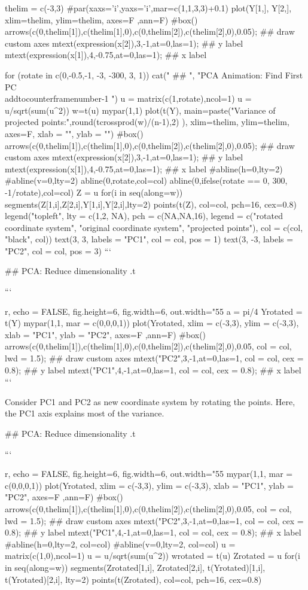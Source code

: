{{thelim = c(-3,3)
#par(xaxs='i',yaxs='i',mar=c(1,1,3,3)+0.1)
plot(Y[1,], Y[2,], xlim=thelim, ylim=thelim, axes=F ,ann=F)
#box()
arrows(c(0,thelim[1]),c(thelim[1],0),c(0,thelim[2]),c(thelim[2],0),0.05); ## draw custom axes
mtext(expression(x[2]),3,-1,at=0,las=1); ## y label
mtext(expression(x[1]),4,-0.75,at=0,las=1); ## x label

for (rotate in c(0,-0.5,-1, -3, -300, 3, 1)) {
  cat("  \n## ", "PCA Animation: Find First PC  \n \\addtocounter{framenumber}{-1}  \n")
  u = matrix(c(1,rotate),ncol=1)
  u = u/sqrt(sum(u^2))
  w=t(u)%
  mypar(1,1)
  plot(t(Y), main=paste("Variance of projected points:",round(tcrossprod(w)/(n-1),2) ),
    xlim=thelim, ylim=thelim, axes=F, xlab = "", ylab = "")
  #box()
  arrows(c(0,thelim[1]),c(thelim[1],0),c(0,thelim[2]),c(thelim[2],0),0.05); ## draw custom axes
mtext(expression(x[2]),3,-1,at=0,las=1); ## y label
mtext(expression(x[1]),4,-0.75,at=0,las=1); ## x label
  #abline(h=0,lty=2)
  #abline(v=0,lty=2)
  abline(0,rotate,col=col)
  abline(0,ifelse(rotate == 0, 300, -1/rotate),col=col)
  Z = u%
  for(i in seq(along=w))
    segments(Z[1,i],Z[2,i],Y[1,i],Y[2,i],lty=2)
  points(t(Z), col=col, pch=16, cex=0.8)
  legend("topleft", lty = c(1,2, NA), pch = c(NA,NA,16), legend = c("rotated coordinate system", "original coordinate system", "projected points"), col = c(col, "black", col))
}
text(3, 3, labels = "PC1", col = col, pos = 1)
text(3, -3, labels = "PC2", col = col, pos = 3)
```

## PCA: Reduce dimensionality {.t}

```{r, echo = FALSE, fig.height=6, fig.width=6, out.width="55%
a = pi/4
Yrotated = t(Y) %
mypar(1,1, mar = c(0,0,0,1))
plot(Yrotated,
  xlim = c(-3,3), ylim = c(-3,3), xlab = "PC1", ylab = "PC2", axes=F ,ann=F)
#box()
arrows(c(0,thelim[1]),c(thelim[1],0),c(0,thelim[2]),c(thelim[2],0),0.05, col = col, lwd = 1.5); ## draw custom axes
mtext("PC2",3,-1,at=0,las=1, col = col, cex = 0.8); ## y label
mtext("PC1",4,-1,at=0,las=1, col = col, cex = 0.8); ## x label
```

Consider PC1 and PC2 as new coordinate system by rotating the points.
Here, the PC1 axis explains most of the variance.

## PCA: Reduce dimensionality {.t}

```{r, echo = FALSE, fig.height=6, fig.width=6, out.width="55%
mypar(1,1, mar = c(0,0,0,1))
plot(Yrotated,
  xlim = c(-3,3), ylim = c(-3,3), xlab = "PC1", ylab = "PC2", axes=F ,ann=F)
#box()
arrows(c(0,thelim[1]),c(thelim[1],0),c(0,thelim[2]),c(thelim[2],0),0.05, col = col, lwd = 1.5); ## draw custom axes
mtext("PC2",3,-1,at=0,las=1, col = col, cex = 0.8); ## y label
mtext("PC1",4,-1,at=0,las=1, col = col, cex = 0.8); ## x label
#abline(h=0,lty=2, col=col)
#abline(v=0,lty=2, col=col)
u = matrix(c(1,0),ncol=1)
u = u/sqrt(sum(u^2))
wrotated = t(u)%
Zrotated = u%
for(i in seq(along=w))
  segments(Zrotated[1,i], Zrotated[2,i], t(Yrotated)[1,i], t(Yrotated)[2,i], lty=2)
points(t(Zrotated), col=col, pch=16, cex=0.8)

}}}}
